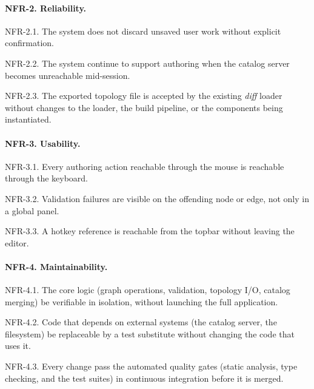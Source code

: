 \paragraph{NFR-2. Reliability.}
\begin{reqlist}
    \item[NFR-2.1.] The system does not discard unsaved user work without explicit confirmation.
    \item[NFR-2.2.] The system continue to support authoring when the catalog server becomes unreachable mid-session.
    \item[NFR-2.3.] The exported topology file is accepted by the existing \textit{diff} loader without changes to the loader, the build pipeline, or the components being instantiated.
\end{reqlist}

\paragraph{NFR-3. Usability.}
\begin{reqlist}
    \item[NFR-3.1.] Every authoring action reachable through the mouse is reachable through the keyboard.
    \item[NFR-3.2.] Validation failures are visible on the offending node or edge, not only in a global panel.
    \item[NFR-3.3.] A hotkey reference is reachable from the topbar without leaving the editor.
\end{reqlist}

\paragraph{NFR-4. Maintainability.}
\begin{reqlist}
    \item[NFR-4.1.] The core logic (graph operations, validation, topology I/O, catalog merging) be verifiable in isolation, without launching the full application.
    \item[NFR-4.2.] Code that depends on external systems (the catalog server, the filesystem) be replaceable by a test substitute without changing the code that uses it.
    \item[NFR-4.3.] Every change pass the automated quality gates (static analysis, type checking, and the test suites) in continuous integration before it is merged.
\end{reqlist}

